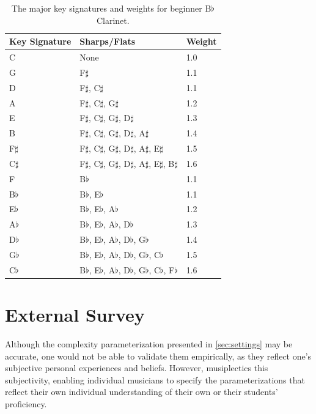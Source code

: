 \documentclass[12pt]{report}
\begin{document}
\begin{table}
	\centering
	\caption{The major key signatures and weights for beginner B$\flat$ Clarinet.}
    \begin{tabular}{| l | l | l |}
        \hline
        Key Signature & Sharps/Flats & Weight \\ \hline
        C & None & 1.0 \\ \hline
        G & F$\sharp$ & 1.1 \\ \hline 
        D & F$\sharp$, C$\sharp$ & 1.1 \\ \hline
        A & F$\sharp$, C$\sharp$, G$\sharp$ & 1.2 \\ \hline
        E & F$\sharp$, C$\sharp$, G$\sharp$, D$\sharp$ & 1.3 \\ \hline
        B & F$\sharp$, C$\sharp$, G$\sharp$, D$\sharp$, A$\sharp$ & 1.4 \\ \hline
        F$\sharp$ & F$\sharp$, C$\sharp$, G$\sharp$, D$\sharp$, A$\sharp$, E$\sharp$ & 1.5 \\ \hline
        C$\sharp$ & F$\sharp$, C$\sharp$, G$\sharp$, D$\sharp$, A$\sharp$, E$\sharp$, B$\sharp$ & 1.6 \\ \hline
        F & B$\flat$ & 1.1 \\ \hline
        B$\flat$ & B$\flat$, E$\flat$ & 1.1 \\ \hline
        E$\flat$ & B$\flat$, E$\flat$, A$\flat$ & 1.2 \\ \hline
        A$\flat$ & B$\flat$, E$\flat$, A$\flat$, D$\flat$ & 1.3 \\ \hline
        D$\flat$ & B$\flat$, E$\flat$, A$\flat$, D$\flat$, G$\flat$ & 1.4 \\ \hline
        G$\flat$ & B$\flat$, E$\flat$, A$\flat$, D$\flat$, G$\flat$, C$\flat$ & 1.5 \\ \hline
        C$\flat$ & B$\flat$, E$\flat$, A$\flat$, D$\flat$, G$\flat$, C$\flat$, F$\flat$ & 1.6 \\
        \hline
    \end{tabular}
	\label{table:key}
\end{table}



\section{External Survey} 
\label{sec:survey}

Although the complexity parameterization presented in \ref{sec:settings} may be accurate, one would not be able to validate them empirically, as they reflect one's subjective personal experiences and beliefs. However, musiplectics this subjectivity, enabling individual musicians to specify the parameterizations that reflect their own individual understanding of their own or their students' proficiency.
\end{document}
